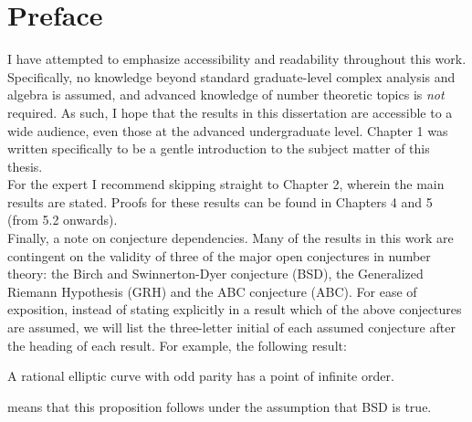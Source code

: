 \documentclass [11pt, proquest] {thesis}[2015/03/03]
\begin{document}
\chapter*{Preface}
I have attempted to emphasize accessibility and readability throughout this work. Specifically, no knowledge beyond standard graduate-level complex analysis and algebra is assumed, and advanced knowledge of number theoretic topics is {\it not} required. As such, I hope that the results in this dissertation are accessible to a wide audience, even those at the advanced undergraduate level. Chapter 1 was written specifically to be a gentle introduction to the subject matter of this thesis. \\

For the expert I recommend skipping straight to Chapter 2, wherein the main results are stated. Proofs for these results can be found in Chapters 4 and 5 (from 5.2 onwards). \\

Finally, a note on conjecture dependencies. Many of the results in this work are contingent on the validity of three of the major open conjectures in number theory: the Birch and Swinnerton-Dyer conjecture (BSD), the Generalized Riemann Hypothesis (GRH) and the ABC conjecture (ABC). For ease of exposition, instead of stating explicitly in a result which of the above conjectures are assumed, we will list the three-letter initial of each assumed conjecture after the heading of each result. For example, the following result:
\begin{proposition}[BSD]
A rational elliptic curve with odd parity has a point of infinite order.
\end{proposition}
means that this proposition follows under the assumption that BSD is true.

%
%
\tableofcontents
 
\end{document}
